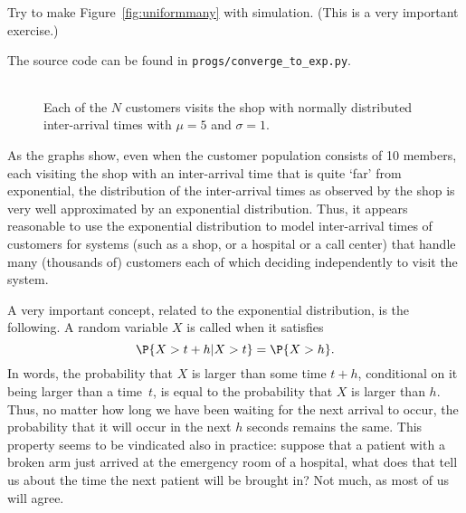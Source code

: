 \begin{exercise}
  Try to make Figure~\ref{fig:uniformmany} with simulation. (This is a very important exercise.)
  \begin{solution}
    The source code can be found in \texttt{progs/converge\_to\_exp.py}.
\end{solution}
\end{exercise}

\begin{figure}[ht]
  \centering
  \begin{tabular}[h]{c}
 
  \end{tabular}
  \caption{Each of the $N$ customers visits the shop with normally
    distributed inter-arrival times with $\mu=5$ and
    $\sigma=1$.}  \label{fig:normal}
\end{figure}

As the graphs show, even when the customer population consists of 10
members, each visiting the shop with an inter-arrival time that is
quite `far' from exponential, the distribution of the inter-arrival
times as observed by the shop is very well approximated by an
exponential distribution. Thus, it appears reasonable to use the
exponential distribution to model inter-arrival times of customers for systems (such as a shop, or a hospital or a call center) that handle many (thousands of)
customers each of which  deciding independently to visit the system.


A very important concept, related to the exponential distribution, is the following. A random variable $X$ is called  when it satisfies
\begin{equation*}
  \P{X > t+h | X>t} = \P{X>h}.
\end{equation*}
In words, the probability that $X$ is larger than some time $t+h$,
conditional on it being larger than a time~$t$, is equal to the
probability that $X$ is larger than $h$. Thus, no matter how long we
have been waiting for the next arrival to occur, the probability that
it will occur in the next $h$ seconds remains the same.  This property
seems to be vindicated also in practice: suppose that a patient with a
broken arm just arrived at the emergency room of a hospital, what does
that tell us about the time the next patient will be brought in? Not
much, as most of us will agree.



